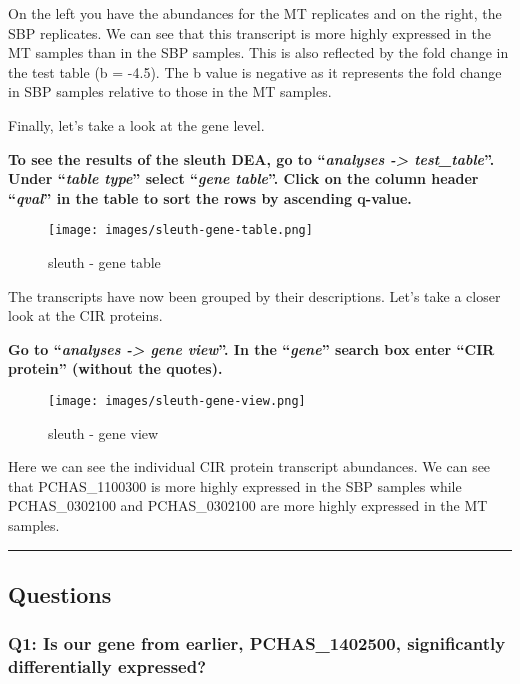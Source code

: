 \documentclass[11pt]{article}
\begin{document}
    On the left you have the abundances for the MT replicates and on the
right, the SBP replicates. We can see that this transcript is more
highly expressed in the MT samples than in the SBP samples. This is also
reflected by the fold change in the test table (b = -4.5). The b value
is negative as it represents the fold change in SBP samples relative to
those in the MT samples.

Finally, let's take a look at the gene level.

\textbf{To see the results of the sleuth DEA, go to ``\textit{analyses
-\textgreater{} test\_table}''. Under ``\textit{table type}'' select
``\textit{gene table}''. Click on the column header ``\textit{qval}'' in the
table to sort the rows by ascending q-value.}

    \begin{figure}[!h]
\centering
\texttt{[image: images/sleuth-gene-table.png]}
\caption{sleuth - gene table}
\end{figure}

    The transcripts have now been grouped by their descriptions. Let's take
a closer look at the CIR proteins.

\textbf{Go to ``\textit{analyses -\textgreater{} gene view}''. In the
``\textit{gene}'' search box enter ``CIR protein'' (without the quotes).}

    \begin{figure}[!h]
\centering
\texttt{[image: images/sleuth-gene-view.png]}
\caption{sleuth - gene view}
\end{figure}

    Here we can see the individual CIR protein transcript abundances. We can
see that PCHAS\_1100300 is more highly expressed in the SBP samples
while PCHAS\_0302100 and PCHAS\_0302100 are more highly expressed in the
MT samples.

    \begin{center}\rule{0.5\linewidth}{.4pt}\end{center}

    \hypertarget{questions}{%
\subsection{Questions}\label{questions}}

\hypertarget{q1-is-our-gene-from-earlier-pchas_1402500-significantly-differentially-expressed}{%
\subsubsection{Q1: Is our gene from earlier, PCHAS\_1402500,
significantly differentially
expressed?}\label{q1-is-our-gene-from-earlier-pchas_1402500-significantly-differentially-expressed}}
\end{document}
